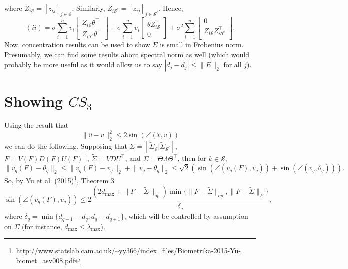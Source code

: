 \documentclass[11pt]{article}
\newcommand{\norm}[1]{\lVert #1 \rVert}
\renewcommand{\S}{\mathcal{S}}
\begin{document}
where $Z_{i\S} = [z_{ij}]_{j \in \S}$. Similarly, $Z_{i\S^c} = [z_{ij}]_{j \in \S^c}$.  Hence, 
\begin{equation}
(ii) = 
\sigma \sum_{i=1}^n v_i
\begin{bmatrix}
 Z_{i\S}\theta^{\top}\\
 Z_{i\S^c}\theta^{\top}
\end{bmatrix}
+
\sigma \sum_{i=1}^n v_i
\begin{bmatrix}
\theta Z_{i\S}^{\top}\\
0
\end{bmatrix}
+
\sigma^2 \sum_{i=1}^n 
\begin{bmatrix}
0 \\
Z_{i\S} Z_{i\S^c}^{\top}\\
\end{bmatrix}.
\end{equation}
Now, concentration results can be used to show $E$ is small in Frobenius norm.  Presumably, we can find some results about spectral norm as well (which would
probably be more useful as it would allow us to say $|d_j - \tilde{d_j}| \leq \norm{E}_2$ for all $j$).

\section{Showing $CS_3$}
Using the result that
\begin{equation}
\norm{\hat{v} - v}_2^2 \leq 2 \sin(\angle (\hat{v},v) )
\end{equation}
we can do the following.  Supposing that 
$\Sigma = [\tilde{\Sigma}_\S | \tilde{\Sigma}_{\S^c}]$, $F = V(F) D(F) U(F)^{\top}$, $\tilde{\Sigma} = V DU^{\top}$, and $\Sigma = \Theta \Lambda \Theta^{\top}$, then for $k \in \S$,
\begin{equation}
\norm{v_q(F) - \theta_q}_2 \leq  \norm{v_q(F) - v_q}_2 + \norm{v_q - \theta_q}_2 \leq \sqrt{2}\left( \sin(\angle (v_q(F), v_q)) + \sin(\angle (v_q,\theta_q))\right).
\end{equation}
So, by Yu et al. (2015)\footnote{\url{http://www.statslab.cam.ac.uk/~yy366/index_files/Biometrika-2015-Yu-biomet_asv008.pdf}}, Theorem 3
\begin{equation}
 \sin(\angle (v_q(F), v_q)) 
 \leq 
 2\frac{(2d_{\max} + \norm{F - \tilde{\Sigma}}_{op})\min\{ \norm{F - \tilde{\Sigma}}_{op}, \norm{F - \tilde{\Sigma}}_{F}\}}{\tilde{\delta}_q},
\end{equation}
where $\tilde{\delta}_q = \min\{d_{q-1} - d_q, d_{q} - d_{q+1}\}$, which will be controlled by assumption on $\Sigma$ (for instance, $d_{\max} \leq \lambda_{\max}$).
\end{document}
